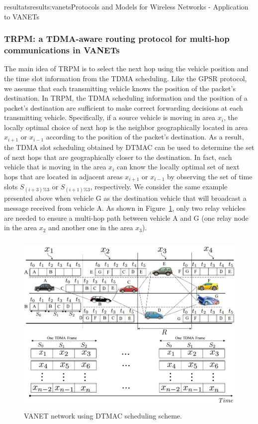 \documentclass{ra2016}
\begin{document}
\begin{module}{resultats}{results:vanets}{Protocols and Models for Wireless Networks - Application to VANETs}
\subsubsection{TRPM: a TDMA-aware routing protocol for multi-hop communications in VANETs}

\begin{participants}
\end{participants}

The main idea of TRPM is to select the next hop using the vehicle position and the time 
slot information from the TDMA scheduling.  Like the GPSR protocol, we assume that each transmitting vehicle 
knows the position of the packet's destination. In TRPM, the TDMA scheduling information and the position of a packet's destination 
are sufficient to make correct forwarding decisions at each transmitting vehicle. Specifically, if a  source vehicle is moving in 
area $x_i$, the locally optimal choice of next hop is the neighbor geographically located in area $x_{i+1}$ or $x_{i-1}$ according 
to the position of the packet's destination. As a result, the TDMA slot scheduling obtained by DTMAC  can be used to determine the 
set of next hops that are geographically closer to the destination. In fact, each vehicle that is moving in the area $x_i$ can 
know the locally optimal set of next hops that are located in adjacent areas $x_{i+1}$ or $x_{i-1}$ by observing the set of time 
slots $S_{(i+3)\%3}$ or $S_{(i+1)\%3}$, respectively. We consider the same example presented above when vehicle G as the destination 
vehicle that will broadcast a message received from vehicle A. As shown in Figure~\ref{figc:trpm}, only two relay vehicles are needed to ensure a 
multi-hop path between vehicle A and G (one relay node in the area $x_2$ and another one in the area $x_3$). 

\begin{figure}[H]
    \begin{center}
        \includegraphics[height=9cm,width=15cm]{IMG/TRPM.jpg}
        \caption{VANET network using DTMAC scheduling scheme.}
        \label{figc:trpm}
    \end{center}
\end{figure}


\end{module}
\end{document}
